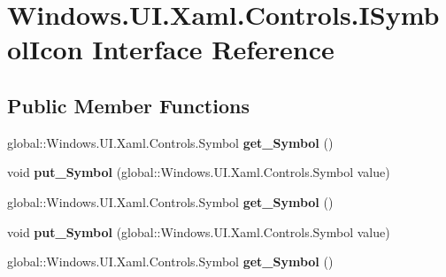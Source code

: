 \hypertarget{interface_windows_1_1_u_i_1_1_xaml_1_1_controls_1_1_i_symbol_icon}{}\section{Windows.\+U\+I.\+Xaml.\+Controls.\+I\+Symbol\+Icon Interface Reference}
\label{interface_windows_1_1_u_i_1_1_xaml_1_1_controls_1_1_i_symbol_icon}
\subsection*{Public Member Functions}
\begin{DoxyCompactItemize}
\item 
\mbox{\label{interface_windows_1_1_u_i_1_1_xaml_1_1_controls_1_1_i_symbol_icon_abbf84381cc7314ad3aa1dc6220fe96e7}} 
global\+::\+Windows.\+U\+I.\+Xaml.\+Controls.\+Symbol {\bfseries get\+\_\+\+Symbol} ()
\item 
\mbox{\label{interface_windows_1_1_u_i_1_1_xaml_1_1_controls_1_1_i_symbol_icon_a78b393db4bddcf871347b15102286258}} 
void {\bfseries put\+\_\+\+Symbol} (global\+::\+Windows.\+U\+I.\+Xaml.\+Controls.\+Symbol value)
\item 
\mbox{\label{interface_windows_1_1_u_i_1_1_xaml_1_1_controls_1_1_i_symbol_icon_abbf84381cc7314ad3aa1dc6220fe96e7}} 
global\+::\+Windows.\+U\+I.\+Xaml.\+Controls.\+Symbol {\bfseries get\+\_\+\+Symbol} ()
\item 
\mbox{\label{interface_windows_1_1_u_i_1_1_xaml_1_1_controls_1_1_i_symbol_icon_a78b393db4bddcf871347b15102286258}} 
void {\bfseries put\+\_\+\+Symbol} (global\+::\+Windows.\+U\+I.\+Xaml.\+Controls.\+Symbol value)
\item 
\mbox{\label{interface_windows_1_1_u_i_1_1_xaml_1_1_controls_1_1_i_symbol_icon_abbf84381cc7314ad3aa1dc6220fe96e7}} 
global\+::\+Windows.\+U\+I.\+Xaml.\+Controls.\+Symbol {\bfseries get\+\_\+\+Symbol} ()

\end{DoxyCompactItemize}
